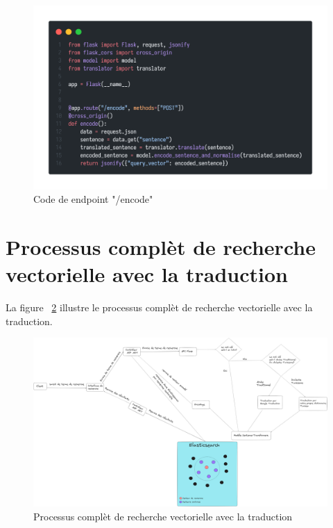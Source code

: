 \begin{figure}[H]
	\centering
	\includegraphics[width=1\textwidth]{logos/encodeendpoint.png}
	\caption{Code de endpoint "/encode"}
	\label{fig:encodeendpoint}
\end{figure}

\newpage
\noindent
\section{Processus complèt de recherche vectorielle avec la traduction}
La figure ~\ref{fig:fullprocesswithtranslation} illustre le processus complèt de recherche vectorielle avec la traduction.

\begin{figure}[H]
	\centering
	\includegraphics[width=1\textwidth]{logos/fullprocesswithtranslation.png}
	\caption{Processus complèt de recherche vectorielle avec la traduction}
	\label{fig:fullprocesswithtranslation}
\end{figure}

